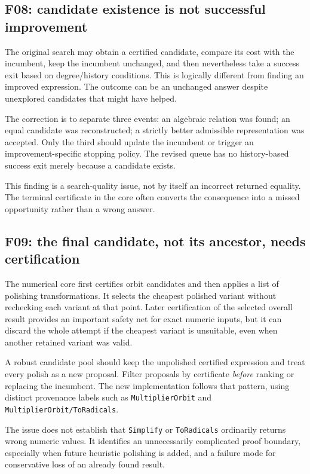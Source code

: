 \documentclass[11pt,letterpaper]{article}
\newcommand{\code}[1]{\texttt{#1}}
\theoremstyle{definition}
\begin{document}
\subsection{F08: candidate existence is not successful improvement}

The original search may obtain a certified candidate, compare its cost with the incumbent, keep the incumbent unchanged, and then nevertheless take a success exit based on degree/history conditions. This is logically different from finding an improved expression. The outcome can be an unchanged answer despite unexplored candidates that might have helped.

The correction is to separate three events: an algebraic relation was found; an equal candidate was reconstructed; a strictly better admissible representation was accepted. Only the third should update the incumbent or trigger an improvement-specific stopping policy. The revised queue has no history-based success exit merely because a candidate exists.

This finding is a search-quality issue, not by itself an incorrect returned equality. The terminal certificate in the core often converts the consequence into a missed opportunity rather than a wrong answer.

\subsection{F09: the final candidate, not its ancestor, needs certification}

The numerical core first certifies orbit candidates and then applies a list of polishing transformations. It selects the cheapest polished variant without rechecking each variant at that point. Later certification of the selected overall result provides an important safety net for exact numeric inputs, but it can discard the whole attempt if the cheapest variant is unsuitable, even when another retained variant was valid.

A robust candidate pool should keep the unpolished certified expression and treat every polish as a new proposal. Filter proposals by certificate \emph{before} ranking or replacing the incumbent. The new implementation follows that pattern, using distinct provenance labels such as \code{MultiplierOrbit} and \code{MultiplierOrbit/ToRadicals}.

The issue does not establish that \code{Simplify} or \code{ToRadicals} ordinarily returns wrong numeric values. It identifies an unnecessarily complicated proof boundary, especially when future heuristic polishing is added, and a failure mode for conservative loss of an already found result.
\end{document}
